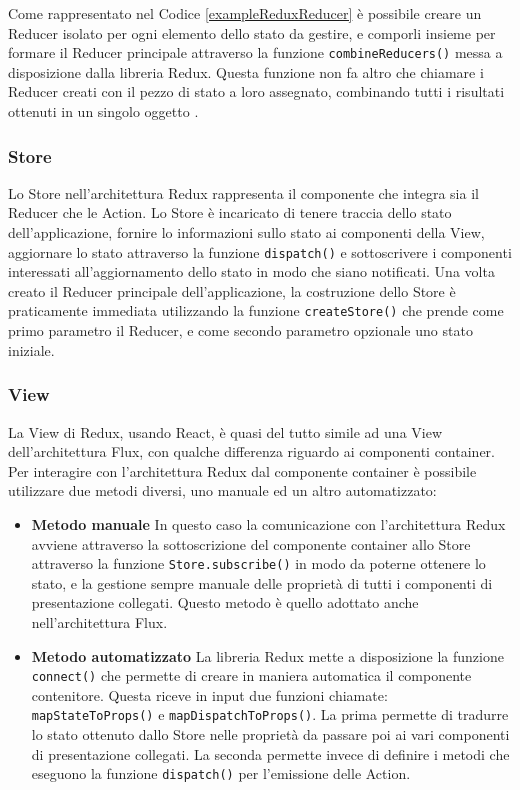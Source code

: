 Come rappresentato nel Codice \ref{exampleReduxReducer} è possibile creare un Reducer isolato per ogni elemento dello stato da gestire, e comporli insieme per formare il Reducer principale attraverso la funzione \texttt{combineReducers()} messa a disposizione dalla libreria Redux. Questa funzione non fa altro che chiamare i Reducer creati con il pezzo di stato a loro assegnato, combinando tutti i risultati ottenuti in un singolo oggetto \cite{ReduxDocumentation}.

\subsubsection*{Store}
Lo Store nell'architettura Redux rappresenta il componente che integra sia il Reducer che le Action. Lo Store è incaricato di tenere traccia dello stato dell'applicazione, fornire lo informazioni sullo stato ai componenti della View, aggiornare lo stato attraverso la funzione \texttt{dispatch()} e sottoscrivere i componenti interessati all'aggiornamento dello stato in modo che siano notificati.
Una volta creato il Reducer principale dell'applicazione, la costruzione dello Store è praticamente immediata utilizzando la funzione \texttt{createStore()} che prende come primo parametro il Reducer, e come secondo parametro opzionale uno stato iniziale.

\subsubsection*{View}
La View di Redux, usando React, è quasi del tutto simile ad una View dell'architettura Flux, con qualche differenza riguardo ai componenti container. Per interagire con l'architettura Redux dal componente container è possibile utilizzare due metodi diversi, uno manuale ed un altro automatizzato:

\begin{itemize}
    \item \textbf{Metodo manuale} In questo caso la comunicazione con l'architettura Redux avviene attraverso la sottoscrizione del componente container allo Store attraverso la funzione \texttt{Store.subscribe()} in modo da poterne ottenere lo stato, e la gestione sempre manuale delle proprietà di tutti i componenti di presentazione collegati. Questo metodo è quello adottato anche nell'architettura Flux.

    \item \textbf{Metodo automatizzato} La libreria Redux mette a disposizione la funzione \texttt{connect()} che permette di creare in maniera automatica il componente contenitore. Questa riceve in input due funzioni chiamate: \texttt{mapStateToProps()} e \texttt{mapDispatchToProps()}. La prima permette di tradurre lo stato ottenuto dallo Store nelle proprietà da passare poi ai vari componenti di presentazione collegati. La seconda permette invece di definire i metodi che eseguono la funzione \texttt{dispatch()} per l'emissione delle Action.
\end{itemize}

